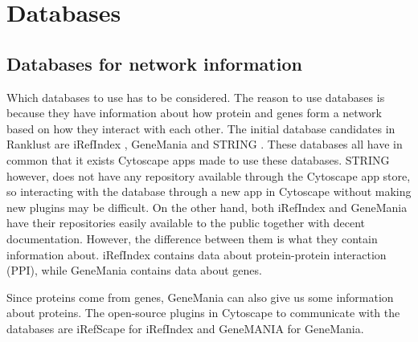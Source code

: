 \chapter{Databases}
\section{Databases for network information}
Which databases to use has to be considered. The reason to use databases is
because they have information about how protein and genes form a network based
on how they interact with each other. The initial database candidates in
Ranklust are iRefIndex \cite{iri}, GeneMania \cite{gm} and STRING \cite{str}.
These databases all have in common that it exists Cytoscape apps made to use
these databases. STRING however, does not have any repository available through
the Cytoscape app store, so interacting with the database through a new app in
Cytoscape without making new plugins may be difficult. On the other hand, both
iRefIndex and GeneMania have their repositories easily available to the public
together with decent documentation. However, the difference between them is what
they contain information about. iRefIndex contains data about protein-protein
interaction (PPI), while GeneMania contains data about genes.

Since proteins come from genes, GeneMania can also give us some information
about proteins. The open-source plugins in Cytoscape to communicate with the
databases are iRefScape \cite{iridb} for iRefIndex and GeneMANIA \cite{gmdb}
for GeneMania.


